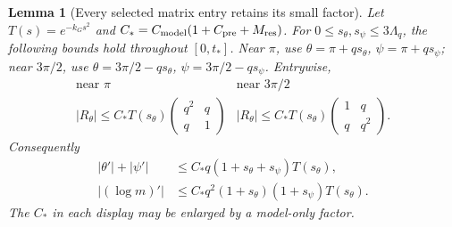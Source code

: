 \documentclass[11pt]{article}
\numberwithin{equation}{section}
\newtheorem{lemma}[theorem]{Lemma}
\theoremstyle{remark}\newtheorem{remark}[theorem]{Remark}
\begin{document}
\begin{lemma}[Every selected matrix entry retains its small factor]
\label{an03pisbv1:matrix}
Let $T(s)=e^{-k_Gs^2}$ and
$C_*=C_{\rm model}(1+C_{\rm pre}+M_{\rm res})$.
For $0\le s_\theta,s_\psi\le3\Lambda_q$, the following bounds
hold throughout $[0,t_*]$.
Near $\pi$, use $\theta=\pi+qs_\theta$, $\psi=\pi+qs_\psi$;
near $3\pi/2$, use $\theta=3\pi/2-qs_\theta$,
$\psi=3\pi/2-qs_\psi$. Entrywise,
\begin{equation}
 \begin{array}{c|c}
 \text{near }\pi&\text{near }3\pi/2\\[2pt]\hline
 |R_\theta|\le C_*T(s_\theta)
       \begin{pmatrix}q^2&q\\q&1\end{pmatrix}
 &
 |R_\theta|\le C_*T(s_\theta)
       \begin{pmatrix}1&q\\q&q^2\end{pmatrix}.
 \end{array}                                      \label{an03pisbv1:table}
\end{equation}
Consequently
\begin{align}
 |\theta'|+|\psi'|
 &\le C_*q(1+s_\theta+s_\psi)T(s_\theta),
                                                        \label{an03pisbv1:angular}\\
 |(\log m)'|
 &\le C_*q^2(1+s_\theta)(1+s_\psi)T(s_\theta).
                                                        \label{an03pisbv1:radial}
\end{align}
The $C_*$ in each display may be enlarged by a model-only factor.
\end{lemma}
\end{document}
